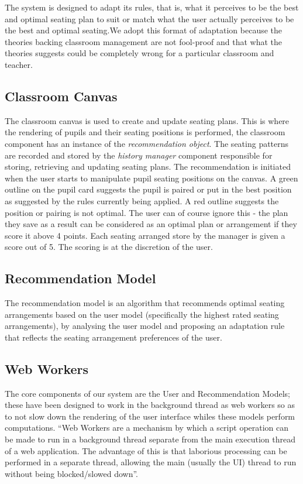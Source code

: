 The system is designed to adapt its rules, that is, what it perceives to be the best and optimal seating plan to suit or match what the user actually perceives to be the best and optimal seating.We adopt this format of adaptation because the theories backing classroom management are not fool-proof and that what the theories suggests could be completely wrong for a particular classroom and teacher.

\subsection{Classroom Canvas} \label{sub:classroom}
The classroom canvas is used to create and update seating plans. This is where the rendering of pupils and their seating positions is performed, the classroom component has an instance of the \emph{recommendation object}. The seating patterns are recorded and stored by the \emph{history manager} component responsible for storing, retrieving and updating seating plans. The recommendation is initiated when the user starts to manipulate pupil seating positions on the canvas. A green outline on the pupil card suggests the pupil is paired or put in the best position as suggested by the rules currently being applied. A red outline suggests the position or pairing is not optimal. The user can of course ignore this - the plan they save as a result can be considered as an optimal plan or arrangement if they score it above 4 points. Each seating arranged store by the manager is given a score out of 5. The scoring is at the discretion of the user.

\subsection{Recommendation Model} \label{sub:RM}
The recommendation model is an algorithm that recommends optimal seating arrangements based on the user model (specifically the highest rated seating arrangements), by analysing the user model and proposing an adaptation rule that reflects the seating arrangement preferences of the user. 

\subsection{Web Workers} \label{sub:webworkers}
The core components of our system are the User and Recommendation Models; these have been designed to work in the background thread as web workers so as to not slow down the rendering of the user interface whiles these models perform computations. ``Web Workers are a mechanism by which a script operation can be made to run in a background thread separate from the main execution thread of a web application. The advantage of this is that laborious processing can be performed in a separate thread, allowing the main (usually the UI) thread to run without being blocked/slowed down''.\cite{website:Mozilla-WebWorkers}
